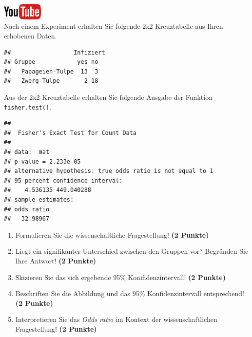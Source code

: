 \documentclass[a4paper, 9pt]{scrartcl}\usepackage[]{graphicx}\usepackage[]{xcolor}
\makeatletter
\newenvironment{kframe}{%
 \def\at@end@of@kframe{}%
 \ifinner\ifhmode%
  \def\at@end@of@kframe{\end{minipage}}%
  \begin{minipage}{\columnwidth}%
 \fi\fi%
 \def\FrameCommand##1{\hskip\@totalleftmargin \hskip-\fboxsep
 \colorbox{shadecolor}{##1}\hskip-\fboxsep
     \hskip-\linewidth \hskip-\@totalleftmargin \hskip\columnwidth}%
 \MakeFramed {\advance\hsize-\width
   \@totalleftmargin\z@ \linewidth\hsize
   \@setminipage}}%
 {\par\unskip\endMakeFramed%
 \at@end@of@kframe}
\newenvironment{knitrout}{}{} %
\makeatother
\begin{document}
\hfill\href{https://youtu.be/ghArbetOr_E}{\includegraphics[width =
  2cm]{img/youtube}}\\[1Ex]

Nach einem Experiment erhalten Sie folgende 2x2 Kreuztabelle aus Ihren
erhobenen Daten.

\begin{knitrout}
\color{fgcolor}\begin{kframe}
\begin{verbatim}
##                  Infiziert
## Gruppe            yes no
##   Papageien-Tulpe  13  3
##   Zwerg-Tulpe       2 18
\end{verbatim}
\end{kframe}
\end{knitrout}

Aus der 2x2 Kreuztabelle erhalten Sie folgende \Rlogo Ausgabe der Funktion
\texttt{fisher.test()}.

\begin{knitrout}
\color{fgcolor}\begin{kframe}
\begin{verbatim}
## 
## 	Fisher's Exact Test for Count Data
## 
## data:  mat
## p-value = 2.233e-05
## alternative hypothesis: true odds ratio is not equal to 1
## 95 percent confidence interval:
##    4.536135 449.040288
## sample estimates:
## odds ratio 
##   32.98967
\end{verbatim}
\end{kframe}
\end{knitrout}


\begin{enumerate}
\item Formulieren Sie die wissenschaftliche Fragestellung! \textbf{(2 Punkte)}
\item Liegt ein signifikanter Unterschied zwischen den Gruppen vor?
  Begr{\"u}nden Sie Ihre Antwort! \textbf{(2 Punkte)}
\item Skizieren Sie das sich ergebende 95\% Konifidenzintervall! \textbf{(2 Punkte)}
\item Beschriften Sie die Abbildung und
  das 95\% Konfidenzintervall entsprechend! \textbf{(2 Punkte)} 
\item Interpretieren Sie das \textit{Odds ratio} im Kontext der
  wissenschaftlichen Fragestellung! \textbf{(2 Punkte)} 
\end{enumerate}
 
\end{document}
